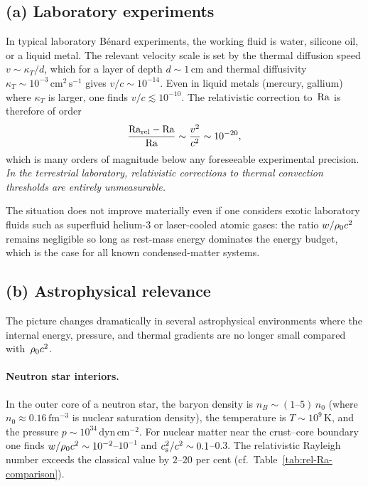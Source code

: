 \subsection*{(a) Laboratory experiments}

In typical laboratory B\'enard experiments, the working fluid is water,
silicone oil, or a liquid metal.  The relevant velocity scale is set by
the thermal diffusion speed $v \sim \kappa_{T}/d$, which for a layer
of depth $d \sim 1$\,cm and thermal diffusivity $\kappa_{T} \sim
10^{-3}\,\mathrm{cm^{2}\,s^{-1}}$ gives $v/c \sim 10^{-14}$.  Even in
liquid metals (mercury, gallium) where $\kappa_{T}$ is larger, one
finds $v/c \lesssim 10^{-10}$.  The relativistic correction to~$\mathrm{Ra}$
is therefore of order
\[
  \frac{\mathrm{Ra}_{\mathrm{rel}} - \mathrm{Ra}}{\mathrm{Ra}} \sim \frac{v^{2}}{c^{2}}
  \sim 10^{-20},
\]
which is many orders of magnitude below any foreseeable experimental
precision.  \emph{In the terrestrial laboratory, relativistic
corrections to thermal convection thresholds are entirely
unmeasurable.}

The situation does not improve materially even if one considers
exotic laboratory fluids such as superfluid helium-3 or laser-cooled
atomic gases: the ratio $w/\rho_0 c^{2}$ remains negligible
so long as rest-mass energy dominates the energy budget, which is the
case for all known condensed-matter systems.


\subsection*{(b) Astrophysical relevance}

The picture changes dramatically in several astrophysical environments
where the internal energy, pressure, and thermal gradients are no
longer small compared with~$\rho_0 c^{2}$.

\paragraph{Neutron star interiors.}
In the outer core of a neutron star, the baryon density is
$n_{B} \sim (1\text{--}5)\,n_{0}$ (where
$n_{0} \approx 0.16\,\mathrm{fm^{-3}}$ is nuclear saturation density),
the temperature is $T \sim 10^{9}$\,K, and the pressure
$p \sim 10^{34}\,\mathrm{dyn\,cm^{-2}}$.  For nuclear matter near the
crust--core boundary one finds $w/\rho_0 c^{2} \sim
10^{-2}$--$10^{-1}$ and $c_{\mathrm{s}}^{2}/c^{2} \sim 0.1$--$0.3$.  The
relativistic Rayleigh number exceeds the classical value by $2$--$20$
per cent (cf.\ Table~\ref{tab:rel-Ra-comparison}).

